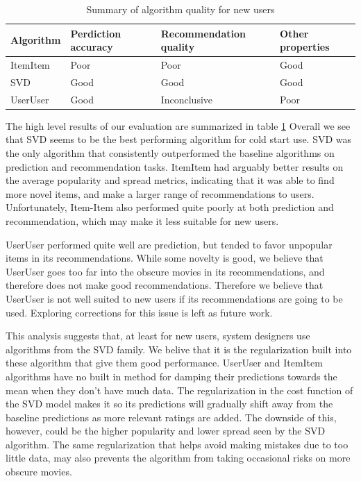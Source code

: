 \documentclass[letterpaper]{sig-alternate}
\begin{document}
  \begin{table}[ht!]
    \centering
    \begin{tabular}{|p{4.5em}|p{4.5em}|p{7.5em}|p{4.5em}|}
      \hline
      Algorithm & Perdiction accuracy & Recommendation quality      & Other properties \\\hline
      ItemItem  & Poor                & Poor                        & Good             \\\hline
      SVD       & Good                & Good                        & Good             \\\hline
      UserUser  & Good                & Inconclusive                & Poor             \\\hline
    \end{tabular}
    \caption{Summary of algorithm quality for new users}
    \label{tbl:results}
  \end{table}

  The high level results of our evaluation are summarized in table \ref{tbl:results}
  Overall we see that SVD seems to be the best performing algorithm for cold start use.
  SVD was the only algorithm that consistently outperformed the baseline algorithms on prediction and recommendation tasks.
  ItemItem had arguably better results on the average popularity and spread metrics, indicating that it was able to find more novel items, and make a larger range of recommendations to users.
  Unfortunately, Item-Item also performed quite poorly at both prediction and recommendation, which may make it less suitable for new users.

  UserUser performed quite well are prediction, but tended to favor unpopular items in its recommendations.
  While some novelty is good, we believe that UserUser goes too far into the obscure movies in its recommendations, and therefore does not make good recommendations.
  Therefore we believe that UserUser is not well suited to new users if its recommendations are going to be used.
  Exploring corrections for this issue is left as future work.

  This analysis suggests that, at least for new users, system designers use algorithms from the SVD family.
  We belive that it is the regularization built into these algorithm that give them good performance.
  UserUser and ItemItem algorithms have no built in method for damping their predictions towards the mean when they don't have much data.
  The regularization in the cost function of the SVD model makes it so its predictions will gradually shift away from the baseline predictions as more relevant ratings are added.
  The downside of this, however, could be the higher popularity and lower spread seen by the SVD algorithm.
  The same regularization that helps avoid making mistakes due to too little data, may also prevents the algorithm from taking occasional risks on more obscure movies.
\end{document}
